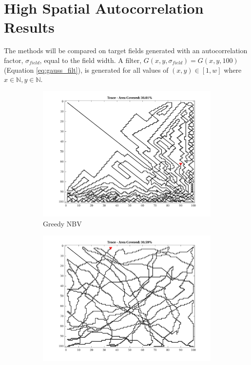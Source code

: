 \section{High Spatial Autocorrelation Results}
The methods will be compared on target fields generated with an autocorrelation factor, $\sigma_{field}$, equal to the field width. A filter, $G(x,y,\sigma_{field}) = G(x,y,100)$ (Equation \ref{eq:gauss_filt}), is generated for all values of $(x,y) \in [1, w]$ where $x \in \mathbb{N}, y \in \mathbb{N}$.

\begin{figure}[htb!]
    \centering
    \begin{subfigure}[t]{0.25\textwidth}
        \centering
        \includegraphics[width=\linewidth]{figures/path_greedy_30p_100x100_sf_100_seed_2.png}
        \captionsetup{skip=0.20\baselineskip,size=footnotesize}
        \caption{Greedy NBV}
    \end{subfigure}%
    \begin{subfigure}[t]{0.25\textwidth}
        \centering
        \includegraphics[width=\linewidth]{figures/path_mc_30p_100x100_sf_100_seed_2.png}

\end{subfigure}
\end{figure}
